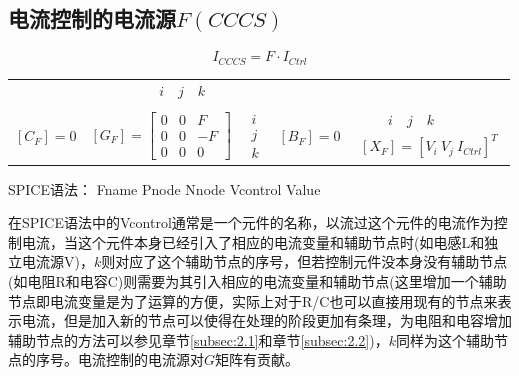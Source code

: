 \documentclass[12pt]{article}
\begin{document}
\subsection{电流控制的电流源$F(CCCS)$}
\begin{equation*}
  I_{CCCS}=F·I_{Ctrl}
\end{equation*}
\begin{table}[H]
  \centering\renewcommand{}
  \begin{tabular}{ccccc}
   & $ \qquad \quad i \quad j \quad k$ & & & \\                            \\
  $\left[C_{F}\right]=0$ & 
  $\left[G_{F}\right]=\left[\begin{array}{ccc} 0 & 0 & F\\ 0 & 0 & -F \\ 0 & 0 & 0\end{array}\right]$  & 
  $\begin{array}{c} i \\ j \\ k\end{array}$ &
  $\left[B_{F}\right]=0$ & 
  $\begin{array}{c} \qquad i \quad j \quad k\\ \left[X_{F}\right]=\left[ V_i\ V_j\ I_{Ctrl}\right]^T \end{array}$ \\
  \end{tabular}
\end{table}
\qquad SPICE语法： Fname Pnode Nnode Vcontrol Value\par
\qquad 在SPICE语法中的Vcontrol通常是一个元件的名称，以流过这个元件的电流作为控制电流，当这个元件本身已经引入了相应的电流变量和辅助节点时(如电感L和独立电流源V)，$k$则对应了这个辅助节点的序号，但若控制元件没本身没有辅助节点(如电阻R和电容C)则需要为其引入相应的电流变量和辅助节点(这里增加一个辅助节点即电流变量是为了运算的方便，实际上对于R/C也可以直接用现有的节点来表示电流，但是加入新的节点可以使得在处理的阶段更加有条理，为电阻和电容增加辅助节点的方法可以参见章节\ref{subsec:2.1}和章节\ref{subsec:2.2})，$k$同样为这个辅助节点的序号。电流控制的电流源对$G$矩阵有贡献。\par
\end{document}
